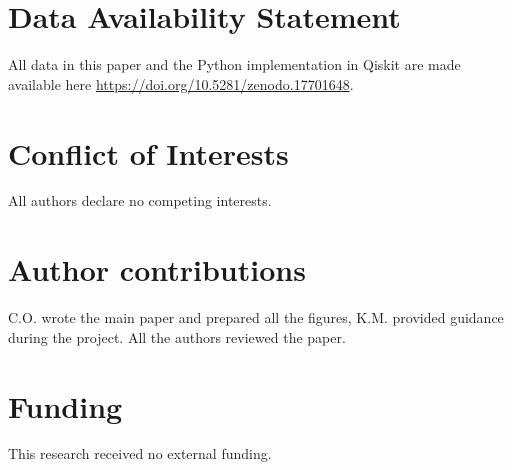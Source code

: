 \documentclass[a4paper,onecolumn,11pt,unpublished]{quantumarticle}
\theoremstyle{remark}
\begin{document}


\section*{Data Availability Statement} All data in this paper and the Python implementation in Qiskit are made available here \url{https://doi.org/10.5281/zenodo.17701648}.


\section*{Conflict of Interests}
All authors declare no competing interests.

\section*{Author contributions}
C.O. wrote the main paper and prepared all the figures, K.M. provided guidance during the project. All the authors reviewed the paper.

\section*{Funding}
This research received no external funding.






\appendix

\printbibliography
\end{document}
